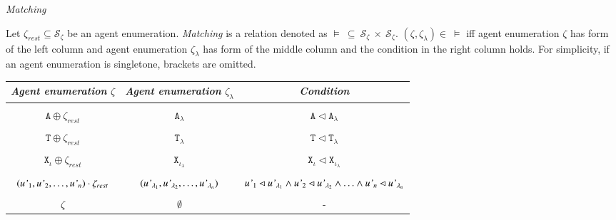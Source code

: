 \documentclass{elsarticle}
\begin{document}
\begin{definition} \label{matching}
\emph{Matching}

\noindent Let $\zeta_{rest} \subseteq \mathcal{S}_\zeta$ be an agent enumeration. \emph{Matching} is a relation denoted as $\models~\subseteq~\mathcal{S}_\zeta~\times~\mathcal{S}_\zeta$. $(\zeta, \zeta_\lambda) \in~\models$ iff agent enumeration $\zeta$ has form of the left column and agent enumeration $\zeta_\lambda$ has form of the middle column and the condition in the right column holds. For simplicity, if an agent enumeration is singletone, brackets are omitted.

\begin{center}
{\footnotesize
\begin{tabular}{ c c c }
  \emph{Agent enumeration} $\zeta$ & \emph{Agent enumeration} $\zeta_\lambda$ & \emph{Condition} \\
  \hline
  & \\[0.02cm]

  $ \mathtt{A} \oplus \zeta_{rest} $ & $\mathtt{A}_\lambda$ & $ \mathtt{A} \lhd \mathtt{A}_\lambda $\\

  & \\[0.02cm]

  $ \mathtt{T} \oplus \zeta_{rest} $ & $\mathtt{T}_\lambda$ & $ \mathtt{T} \lhd \mathtt{T}_\lambda $ \\

  & \\[0.02cm]

  $ \mathtt{X}_\iota \oplus \zeta_{rest} $ & $\mathtt{X}_{\iota_\lambda}$ & $ \mathtt{X}_\iota \lhd \mathtt{X}_{\iota_\lambda} $ \\

  & \\[0.02cm]

  $ (\emph{u'}_1, \emph{u'}_2, \ldots, \emph{u'}_n) \cdot \zeta_{rest} $ & $ (\emph{u'}_{\lambda_1}, \emph{u'}_{\lambda_2}, \ldots, \emph{u'}_{\lambda_n}) $ & $ \emph{u'}_1 \lhd \emph{u'}_{\lambda_1} \wedge \emph{u'}_2 \lhd \emph{u'}_{\lambda_2} \wedge \ldots \wedge \emph{u'}_n \lhd \emph{u'}_{\lambda_n}$ \\

  & \\[0.02cm]

  $\zeta$ & $ \emptyset $ &  - \\

\end{tabular}}
\end{center}

\end{definition}
\end{document}
